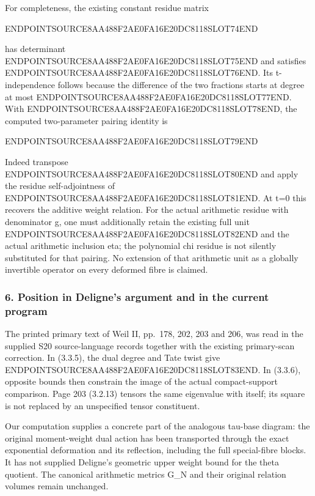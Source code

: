 For completeness, the existing constant residue matrix

ENDPOINTSOURCE8AA488F2AE0FA16E20DC8118SLOT74END

has determinant ENDPOINTSOURCE8AA488F2AE0FA16E20DC8118SLOT75END and satisfies ENDPOINTSOURCE8AA488F2AE0FA16E20DC8118SLOT76END. Its t-independence follows because the difference of the two fractions starts at degree at most ENDPOINTSOURCE8AA488F2AE0FA16E20DC8118SLOT77END. With ENDPOINTSOURCE8AA488F2AE0FA16E20DC8118SLOT78END, the computed two-parameter pairing identity is

ENDPOINTSOURCE8AA488F2AE0FA16E20DC8118SLOT79END

Indeed transpose ENDPOINTSOURCE8AA488F2AE0FA16E20DC8118SLOT80END and apply the residue self-adjointness of ENDPOINTSOURCE8AA488F2AE0FA16E20DC8118SLOT81END. At t=0 this recovers the additive weight relation. For the actual arithmetic residue with denominator g, one must additionally retain the existing full unit ENDPOINTSOURCE8AA488F2AE0FA16E20DC8118SLOT82END and the actual arithmetic inclusion eta; the polynomial chi residue is not silently substituted for that pairing. No extension of that arithmetic unit as a globally invertible operator on every deformed fibre is claimed.

\subsubsection{6. Position in Deligne's argument and in the current program}\label{endpoint-f1_reflection--position-in-delignes-argument-and-in-the-current-program}

The printed primary text of Weil II, pp.~178, 202, 203 and 206, was read in the supplied S20 source-language records together with the existing primary-scan correction. In (3.3.5), the dual degree and Tate twist give ENDPOINTSOURCE8AA488F2AE0FA16E20DC8118SLOT83END. In (3.3.6), opposite bounds then constrain the image of the actual compact-support comparison. Page 203 (3.2.13) tensors the same eigenvalue with itself; its square is not replaced by an unspecified tensor constituent.

Our computation supplies a concrete part of the analogous tau-base diagram: the original moment-weight dual action has been transported through the exact exponential deformation and its reflection, including the full special-fibre blocks. It has not supplied Deligne's geometric upper weight bound for the theta quotient. The canonical arithmetic metrics G\_N and their original relation volumes remain unchanged.

